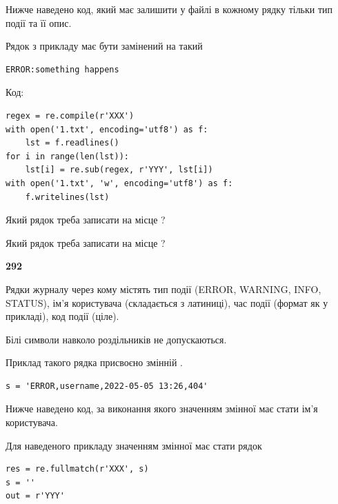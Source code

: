 Нижче наведено код, який має залишити у файлі в кожному рядку тільки тип події та її опис.

Рядок з прикладу має бути замінений на такий



\begin{verbatim}
ERROR:something happens
\end{verbatim}




Код:



\begin{verbatim}
regex = re.compile(r'XXX')
with open('1.txt', encoding='utf8') as f:
    lst = f.readlines()
for i in range(len(lst)):
    lst[i] = re.sub(regex, r'YYY', lst[i])
with open('1.txt', 'w', encoding='utf8') as f:
    f.writelines(lst)
\end{verbatim}









Який рядок треба записати на місце  ?\par
\vspace{5mm}


Який рядок треба записати на місце  ?\par


\newpage

{\begin {center}\textbf{ 292}\end {center}}\par
Рядки журналу через кому містять тип події (ERROR, WARNING, INFO, STATUS), ім'я користувача (складається з латиниці), час події (фор\-мат як у прикладі), код події (ціле).

Білі символи навколо роздільників не допускаються.

Приклад такого рядка присвоєно змінній .



\begin{verbatim}
s = 'ERROR,username,2022-05-05 13:26,404'
\end{verbatim}


Нижче наведено код, за виконання якого значенням змінної  має стати ім'я користувача.

Для наведеного прикладу значенням змінної  має стати рядок 



\begin{verbatim}
res = re.fullmatch(r'XXX', s)
s = ''
out = r'YYY'
\end{verbatim}


